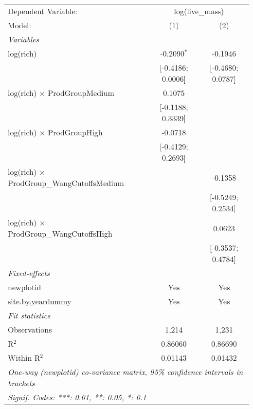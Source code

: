 \begin{tabular}{lcc}
\tabularnewline\midrule\midrule
Dependent Variable:&\multicolumn{2}{c}{log(live\_mass)}\\
Model:&(1) & (2)\\
\midrule \emph{Variables}&   &  \\
log(rich)&-0.2090$^{*}$ & -0.1946\\
  &[-0.4186; 0.0006] & [-0.4680; 0.0787]\\
log(rich) $\times $ ProdGroupMedium&0.1075 &   \\
  &[-0.1188; 0.3339] &   \\
log(rich) $\times $ ProdGroupHigh&-0.0718 &   \\
  &[-0.4129; 0.2693] &   \\
log(rich) $\times $ ProdGroup\_WangCutoffsMedium&   & -0.1358\\
  &   & [-0.5249; 0.2534]\\
log(rich) $\times $ ProdGroup\_WangCutoffsHigh&   & 0.0623\\
  &   & [-0.3537; 0.4784]\\
\midrule \emph{Fixed-effects}&   &  \\
newplotid & Yes & Yes\\
site.by.yeardummy & Yes & Yes\\
\midrule \emph{Fit statistics}&  & \\
Observations & 1,214&1,231\\
R$^2$ & 0.86060&0.86690\\
Within R$^2$ & 0.01143&0.01432\\
\midrule\midrule\multicolumn{3}{l}{\emph{One-way (newplotid) co-variance matrix, 95\% confidence intervals in brackets}}\\
\multicolumn{3}{l}{\emph{Signif. Codes: ***: 0.01, **: 0.05, *: 0.1}}\\
\end{tabular}


